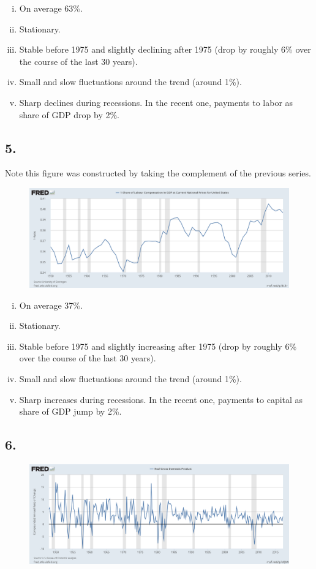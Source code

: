 \documentclass[12pt]{article}
\theoremstyle{definition}
\begin{document}
\begin{enumerate}[(i)]
	\item On average 63\%.
	\item Stationary.
	\item Stable before 1975 and slightly declining after 1975 (drop by roughly 6\% over the course of the last 30 years).
	\item Small and slow fluctuations around the trend (around 1\%).
	\item Sharp declines during recessions. In the recent one, payments to labor as share of GDP drop by 2\%.
\end{enumerate}

\subsection*{5.}

Note this figure was constructed by taking the complement of the previous series.
\begin{figure}[H]
	\centering
	\includegraphics[width=0.9\linewidth]{plot5}
	\label{fig:plot5}
\end{figure}

\begin{enumerate}[(i)]
	\item On average 37\%.
	\item Stationary.
	\item Stable before 1975 and slightly increasing after 1975 (drop by roughly 6\% over the course of the last 30 years).
	\item Small and slow fluctuations around the trend (around 1\%).
	\item Sharp increases during recessions. In the recent one, payments to capital as share of GDP jump by 2\%.
\end{enumerate}

\subsection*{6.}
\begin{figure}[H]
	\centering
	\includegraphics[width=0.9\linewidth]{plot6}
	\label{fig:plot6}
\end{figure}
\end{document}
